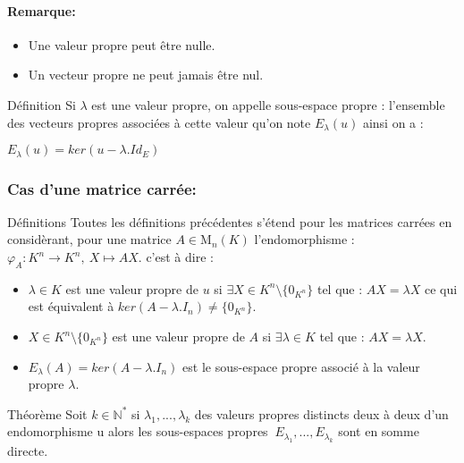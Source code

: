 \documentclass{book}
\begin{document}
\paragraph{Remarque:}
\begin{itemize}
    \item Une valeur propre peut être nulle.
    \item Un vecteur propre ne peut jamais être nul.
\end{itemize}
\begin{Définition}[]{Définition}{}
Si \(\lambda\) est une valeur propre, on appelle sous-espace propre : l'ensemble des vecteurs propres associées à cette valeur qu'on note \(E_{\lambda}(u)\) ainsi on a :
\begin{center}
\begin{framed}
    \(E_{\lambda}(u)=ker(u-\lambda.Id_{E})\)
\end{framed}
\end{center}
\end{Définition}
\subsubsection{Cas d'une matrice carrée:}
\begin{Définition}[]{Définitions}{}
Toutes les définitions précédentes s'étend pour les matrices carrées en considèrant, pour une matrice \(A\in \mathrm {M} _{n}(K)\) l'endomorphisme :
${\displaystyle \varphi _{A}:K^{n}\to K^{n},\ X\mapsto AX}.$
c'est à dire :
\begin{itemize}
    \item   \(\lambda \in K\) est une valeur propre de \(u\) si \(\exists X \in K^n \setminus \{0_{K^n}\}\) tel que : \(AX=\lambda X\) ce qui est équivalent à \(ker(A-\lambda.I_{n}) \neq \{0_{K^n}\}\).
    \item \(X \in K^n \setminus \{0_{K^n}\}\) est une valeur propre de \(A\) si \(\exists \lambda \in K\) tel que : \(AX=\lambda X\).
    \item \(E_{\lambda}(A)=ker(A-\lambda.I_{n})\) est le sous-espace propre associé à la valeur propre \(\lambda\).
\end{itemize}
\end{Définition}
\begin{Théorème}[]{Théorème}{}
Soit \(k \in \mathbb{N}^*\) si \(\lambda_{1},...,\lambda_{k}\) des valeurs propres distincts deux à deux d'un endomorphisme u alors les sous-espaces propres \(\ E_{\lambda_{1}},...,E_{\lambda_{k}}\) sont en somme directe.
\end{Théorème}
\end{document}
